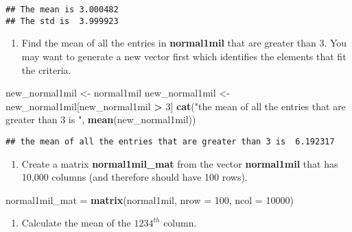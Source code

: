 \documentclass[]{article}
\newenvironment{Shaded}{\begin{snugshade}}{\end{snugshade}}
\newcommand{\KeywordTok}[1]{\textcolor[rgb]{0.13,0.29,0.53}{\textbf{#1}}}
\newcommand{\DataTypeTok}[1]{\textcolor[rgb]{0.13,0.29,0.53}{#1}}
\newcommand{\DecValTok}[1]{\textcolor[rgb]{0.00,0.00,0.81}{#1}}
\newcommand{\StringTok}[1]{\textcolor[rgb]{0.31,0.60,0.02}{#1}}
\newcommand{\OperatorTok}[1]{\textcolor[rgb]{0.81,0.36,0.00}{\textbf{#1}}}
\newcommand{\NormalTok}[1]{#1}
\providecommand{\tightlist}{%
  \setlength{\itemsep}{0pt}\setlength{\parskip}{0pt}}
\begin{document}
\begin{verbatim}
## The mean is 3.000482 
## The std is  3.999923
\end{verbatim}

\begin{enumerate}
\def\labelenumi{\arabic{enumi})}
\setcounter{enumi}{5}
\tightlist
\item
  Find the mean of all the entries in \textbf{normal1mil} that are
  greater than 3. You may want to generate a new vector first which
  identifies the elements that fit the criteria.
\end{enumerate}

\begin{Shaded}
\begin{Highlighting}[]
\NormalTok{new_normal1mil <-}\StringTok{ }\NormalTok{normal1mil}
\NormalTok{new_normal1mil <-}\StringTok{ }\NormalTok{new_normal1mil[new_normal1mil }\OperatorTok{>}\StringTok{ }\DecValTok{3}\NormalTok{]}
\KeywordTok{cat}\NormalTok{(}\StringTok{"the mean of all the entries that are greater than 3 is "}\NormalTok{, }\KeywordTok{mean}\NormalTok{(new_normal1mil))}
\end{Highlighting}
\end{Shaded}

\begin{verbatim}
## the mean of all the entries that are greater than 3 is  6.192317
\end{verbatim}

\begin{enumerate}
\def\labelenumi{\arabic{enumi})}
\setcounter{enumi}{6}
\tightlist
\item
  Create a matrix \textbf{normal1mil\_mat} from the vector
  \textbf{normal1mil} that has 10,000 columns (and therefore should have
  100 rows).
\end{enumerate}

\begin{Shaded}
\begin{Highlighting}[]
\NormalTok{normal1mil_mat =}\StringTok{ }\KeywordTok{matrix}\NormalTok{(normal1mil, }\DataTypeTok{nrow =} \DecValTok{100}\NormalTok{, }\DataTypeTok{ncol =} \DecValTok{10000}\NormalTok{)}
\end{Highlighting}
\end{Shaded}

\begin{enumerate}
\def\labelenumi{\arabic{enumi})}
\setcounter{enumi}{7}
\tightlist
\item
  Calculate the mean of the \(1234^{th}\) column.
\end{enumerate}
\end{document}
